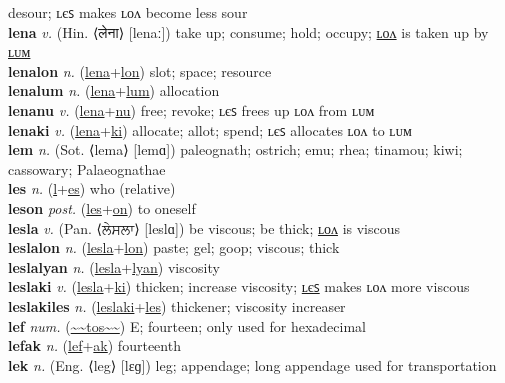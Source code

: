 desour; ʟєꜱ makes ʟᴏᴧ become less sour \label{leneki} \\
\textbf{lena} \textit{v.} (Hin. ⟨लेना⟩ [lenaː])
take up; consume; hold; occupy; \hyperref[lenalon]{ʟᴏᴧ} is taken up by \hyperref[lenalum]{ʟᴜᴍ} \label{lena} \\
\textbf{lenalon} \textit{n.} (\hyperref[lena]{lena}+\hyperref[lon]{lon})
slot; space; resource \label{lenalon} \\
\textbf{lenalum} \textit{n.} (\hyperref[lena]{lena}+\hyperref[lum]{lum})
allocation \label{lenalum} \\
\textbf{lenanu} \textit{v.} (\hyperref[lena]{lena}+\hyperref[nu]{nu})
free; revoke; ʟєꜱ frees up ʟᴏᴧ from ʟᴜᴍ \label{lenanu} \\
\textbf{lenaki} \textit{v.} (\hyperref[lena]{lena}+\hyperref[ki]{ki})
allocate; allot; spend; ʟєꜱ allocates ʟᴏᴧ to ʟᴜᴍ \label{lenaki} \\
\textbf{lem} \textit{n.} (Sot. ⟨lema⟩ [lemɑ])
paleognath; ostrich; emu; rhea; tinamou; kiwi; cassowary; Palaeognathae \label{lem} \\
\textbf{les} \textit{n.} (\hyperref[l]{l}+\hyperref[s]{es})
who (relative) \label{les} \\
\textbf{leson} \textit{post.} (\hyperref[les]{les}+\hyperref[on]{on})
to oneself \label{leson} \\
\textbf{lesla} \textit{v.} (Pan. ⟨ਲੇਸਲਾ⟩ [leslɑ])
be viscous; be thick; \hyperref[leslalon]{ʟᴏᴧ} is viscous \label{lesla} \\
\textbf{leslalon} \textit{n.} (\hyperref[lesla]{lesla}+\hyperref[lon]{lon})
paste; gel; goop; viscous; thick \label{leslalon} \\
\textbf{leslalyan} \textit{n.} (\hyperref[lesla]{lesla}+\hyperref[lyan]{lyan})
viscosity \label{leslalyan} \\
\textbf{leslaki} \textit{v.} (\hyperref[lesla]{lesla}+\hyperref[ki]{ki})
thicken; increase viscosity; \hyperref[leslakiles]{ʟєꜱ} makes ʟᴏᴧ more viscous \label{leslaki} \\
\textbf{leslakiles} \textit{n.} (\hyperref[leslaki]{leslaki}+\hyperref[les]{les})
thickener; viscosity increaser \label{leslakiles} \\
\textbf{lef} \textit{num.} (\hyperref[tos]{\~{}\~{}tos\~{}\~{}})
E; fourteen; only used for hexadecimal \label{lef} \\
\textbf{lefak} \textit{n.} (\hyperref[lef]{lef}+\hyperref[ak]{ak})
fourteenth \label{lefak} \\
\textbf{lek} \textit{n.} (Eng. ⟨leg⟩ [lɛɡ])
leg; appendage; long appendage used for transportation \label{lek} \\
